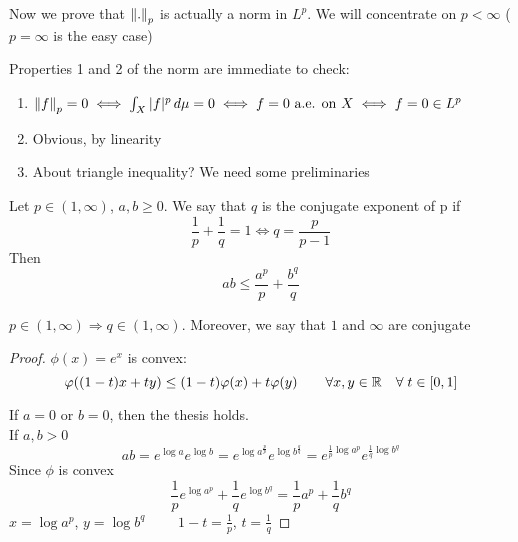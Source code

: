 Now we prove that \(\norm{.}_p\) is actually a norm in \(L^p\). 
We will concentrate on \(p < \infty\) (\(p = \infty\) is the easy case) 

Properties 1 and 2 of the norm are immediate to check:
\begin{enumerate}
    \item \(\norm{f}_p = 0 \iff \int_X |f|^p \, d\mu =0 \iff f=0 \text{ a.e. on } X \iff f=0 \in L^p\)
    \item Obvious, by linearity
    \item About triangle inequality? We need some preliminaries
\end{enumerate}

\begin{theorem}
    Let \(p \in (1, \infty)\), \(a, b \geq 0\). We say that \(q\) is the conjugate exponent of p if 
    \[
        \frac{1}{p} + \frac{1}{q} = 1 \iff q = \frac{p}{p-1}
    \]
    Then 
    \[
        ab \leq \frac{a^p}{p} + \frac{b^q}{q}
    \]
\end{theorem}
\begin{remark}
    \(p \in (1, \infty) \Rightarrow q \in (1, \infty)\). Moreover, we say that \(1\) and \(\infty\) are conjugate
\end{remark}
\begin{proof}
    \(\phi(x)= e^{x}\) is convex: 
    \[
        \varphi((1-t)x + ty) \leq (1-t)\varphi(x) + t \varphi(y) \qquad \forall x, y \in \mathbb{R} \quad \forall \; t \in [0, 1]
    \]

    If \(a=0\) or \(b=0\), then the thesis holds. \\
    If \(a, b >0\)
    \[
        ab = e^{\log{a}} e^{\log{b}}
        = e^{\log{a}^{\frac{p}{p}}} e^{\log{b}^{\frac{q}{q}}}
        = e^{\frac{1}{p}\log{a}^p} e^{\frac{1}{q}\log{b}^q}
    \]
    Since \(\phi \) is convex
    \[
        \frac{1}{p} e^{\log{a}^p} + \frac{1}{q} e^{\log{b}^q} = \frac{1}{p} a^p + \frac{1}{q} b^q
    \]
    \(x = \log{a^p}\), \(y= \log{b^q}\) \(\qquad 1-t = \frac{1}{p}\), \(t=\frac{1}{q}\)
\end{proof}


